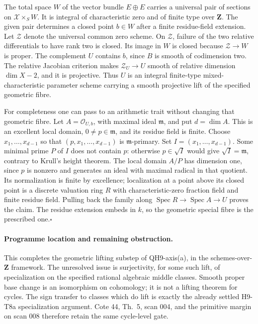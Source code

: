 \documentclass[11pt]{article}
\theoremstyle{remark}\newtheorem{remark}[theorem]{Remark}
\begin{document}
The total space $W$ of the vector bundle $E\oplus E$ carries a
universal pair of sections on $\mathcal X\times_S W$. It is
integral of characteristic zero and of finite type over
$\mathbf Z$. The given pair determines a closed point $b\in W$
after a finite residue-field extension. Let $\mathcal Z$ denote
the universal common zero scheme. On $\mathcal Z$, failure of the
two relative differentials to have rank two is closed. Its image
in $W$ is closed because $\mathcal Z\to W$ is proper. The
complement $U$ contains $b$, since $B$ is smooth of codimension
two. The relative Jacobian criterion makes $\mathcal Z_U\to U$
smooth of relative dimension $\dim X-2$, and it is projective.
Thus $U$ is an integral finite-type mixed-characteristic
parameter scheme carrying a smooth projective lift of the
specified geometric fibre.

For completeness one can pass to an arithmetic trait without
changing that geometric fibre. Let $A=\mathcal O_{U,b}$, with
maximal ideal $\mathfrak m$, and put $d=\dim A$. This is an
excellent local domain, $0\ne p\in\mathfrak m$, and its residue
field is finite. Choose $x_1,\ldots,x_{d-1}$ so that
$(p,x_1,\ldots,x_{d-1})$ is $\mathfrak m$-primary. Set
$I=(x_1,\ldots,x_{d-1})$. Some minimal prime $P$ of $I$ does
not contain $p$: otherwise $p\in\sqrt I$ would give
$\sqrt I=\mathfrak m$, contrary to Krull's height theorem.
The local domain $A/P$ has dimension one, since $p$ is nonzero
and generates an ideal with maximal radical in that quotient.
Its normalization is finite by excellence; localization at a
point above its closed point is a discrete valuation ring $R$
with characteristic-zero fraction field and finite residue field.
Pulling back the family along
$\operatorname{Spec}R\to\operatorname{Spec}A\to U$ proves the
claim. The residue extension embeds in $k$, so the geometric
special fibre is the prescribed one.\hfill$\square$

\paragraph{Programme location and remaining obstruction.}
This completes the geometric lifting substep of QH9-axis(a),
in the schemes-over-$\mathbf Z$ framework. The unresolved issue
is surjectivity, for some such lift, of specialization on the
specified rational algebraic middle classes. Smooth proper base
change is an isomorphism on cohomology; it is not a lifting
theorem for cycles. The sign transfer to classes which do lift
is exactly the already settled H9-T8a specialization argument.
Cote 44, Th.~5, scan 004, and the primitive margin on scan 008
therefore retain the same cycle-level gate.
\end{document}
